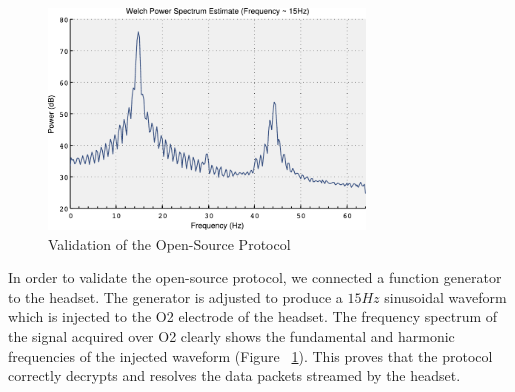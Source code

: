 \documentclass[12pt]{article}
\numberwithin{equation}{section}
\numberwithin{figure}{section}
\numberwithin{table}{section}
\begin{document}
\par{
    \begin{figure}[ht]
        \centering
        \includegraphics[width=0.75\textwidth]{images/emokit_validation}
        \caption{Validation of the Open-Source Protocol}
        \label{fig:emokit_validation}
    \end{figure}
    In order to validate the open-source protocol, we connected a function generator
    to the headset. The generator is adjusted to produce a $15Hz$ sinusoidal waveform
    which is injected to the O2 electrode of the headset. The frequency spectrum
    of the signal acquired over O2 clearly shows the fundamental and harmonic
    frequencies of the injected waveform (Figure ~\ref{fig:emokit_validation}).
    This proves that the protocol correctly decrypts and resolves the data packets streamed by the headset.
}
\end{document}
